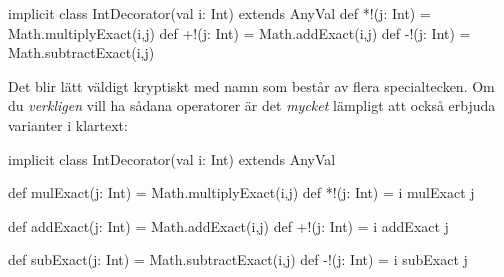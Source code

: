 {\SubtaskSolved

\begin{Code}
implicit class IntDecorator(val i: Int) extends AnyVal{
  def *!(j: Int) = Math.multiplyExact(i,j)
  def +!(j: Int) = Math.addExact(i,j)
  def -!(j: Int) = Math.subtractExact(i,j)
}
\end{Code}


\SubtaskSolved Det blir lätt väldigt kryptiskt med namn som består av flera specialtecken. Om du \emph{verkligen} vill ha sådana operatorer är det \emph{mycket} lämpligt att också erbjuda varianter i klartext:
\begin{Code}
implicit class IntDecorator(val i: Int) extends AnyVal{
  def mulExact(j: Int) = Math.multiplyExact(i,j)
  def *!(j: Int) = i mulExact j

  def addExact(j: Int) = Math.addExact(i,j)
  def +!(j: Int) = i addExact j

  def subExact(j: Int) = Math.subtractExact(i,j)
  def -!(j: Int) = i subExact j
}

\end{Code}


\QUESTEND










}
